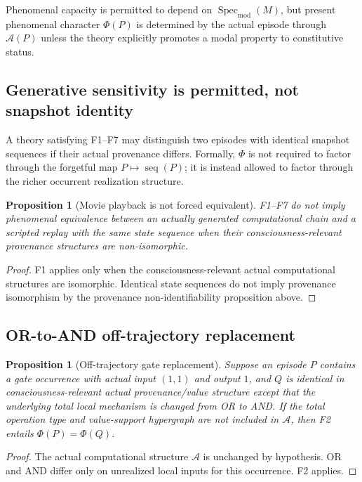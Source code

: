 \documentclass[11pt,a4paper]{article}
\theoremstyle{clean}
\newtheorem{proposition}[theorem]{Proposition}
\theoremstyle{definition}
\newcommand{\Spec}{\operatorname{Spec}}
\newcommand{\Mod}{\mathrm{mod}}
\begin{document}
\begin{axiombox}[title={F7. Capacity--Occurrence Separation}]
Phenomenal capacity is permitted to depend on $\Spec_\Mod(M)$, but present phenomenal character $\Phi(P)$ is determined by the actual episode through $\mathcal A(P)$ unless the theory explicitly promotes a modal property to constitutive status.
\end{axiombox}

\subsection{Generative sensitivity is permitted, not snapshot identity}

A theory satisfying F1--F7 may distinguish two episodes with identical snapshot sequences if their actual provenance differs. Formally, $\Phi$ is not required to factor through the forgetful map $P\mapsto\operatorname{seq}(P)$; it is instead allowed to factor through the richer occurrent realization structure.

\begin{proposition}[Movie playback is not forced equivalent]
F1--F7 do not imply phenomenal equivalence between an actually generated computational chain and a scripted replay with the same state sequence when their consciousness-relevant provenance structures are non-isomorphic.
\end{proposition}
\begin{proof}
F1 applies only when the consciousness-relevant actual computational structures are isomorphic. Identical state sequences do not imply provenance isomorphism by the provenance non-identifiability proposition above.
\end{proof}

\subsection{OR-to-AND off-trajectory replacement}

\begin{proposition}[Off-trajectory gate replacement]
Suppose an episode $P$ contains a gate occurrence with actual input $(1,1)$ and output $1$, and $Q$ is identical in consciousness-relevant actual provenance/value structure except that the underlying total local mechanism is changed from OR to AND. If the total operation type and value-support hypergraph are not included in $\mathcal A$, then F2 entails $\Phi(P)=\Phi(Q)$.
\end{proposition}
\begin{proof}
The actual computational structure $\mathcal A$ is unchanged by hypothesis. OR and AND differ only on unrealized local inputs for this occurrence. F2 applies.
\end{proof}
\end{document}
